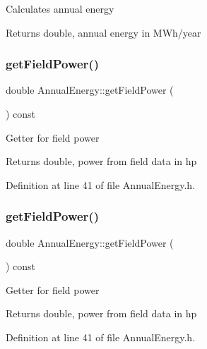 Calculates annual energy \begin{DoxyReturn}{Returns}
double, annual energy in M\+Wh/year 
\end{DoxyReturn}
\mbox{\label{class_annual_energy_a52aa52274243f578ea7f92d27707cacb}} 
\subsubsection{\texorpdfstring{get\+Field\+Power()}{getFieldPower()}\hspace{0.1cm}{\footnotesize\ttfamily [1/3]}}
{\footnotesize\ttfamily double Annual\+Energy\+::get\+Field\+Power (\begin{DoxyParamCaption}{ }\end{DoxyParamCaption}) const\hspace{0.3cm}{\ttfamily [inline]}}

Getter for field power \begin{DoxyReturn}{Returns}
double, power from field data in hp 
\end{DoxyReturn}


Definition at line 41 of file Annual\+Energy.\+h.

\mbox{\label{class_annual_energy_a52aa52274243f578ea7f92d27707cacb}} 
\subsubsection{\texorpdfstring{get\+Field\+Power()}{getFieldPower()}\hspace{0.1cm}{\footnotesize\ttfamily [2/3]}}
{\footnotesize\ttfamily double Annual\+Energy\+::get\+Field\+Power (\begin{DoxyParamCaption}{ }\end{DoxyParamCaption}) const\hspace{0.3cm}{\ttfamily [inline]}}

Getter for field power \begin{DoxyReturn}{Returns}
double, power from field data in hp 
\end{DoxyReturn}


Definition at line 41 of file Annual\+Energy.\+h.

